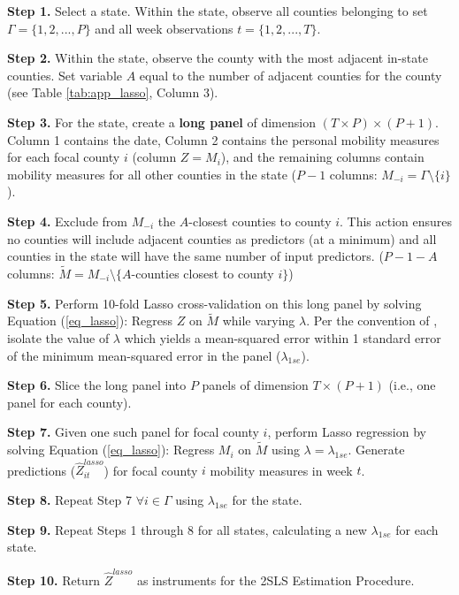  \noindent \textbf{Step 1.} Select a state. Within the state, observe all counties belonging to set $ \Gamma = \{1,2,...,P\}$ and all week observations $t=\{1,2,...,T\}$. \par
 \noindent \textbf{Step 2.} Within the state, observe the county with the most adjacent in-state counties. Set variable $A$ equal to the number of adjacent counties for the county (see Table \ref{tab:app_lasso}, Column 3).  \par
 \noindent \textbf{Step 3.} For the state, create a \textbf{long panel} of dimension $(T\times P) \times (P+1)$. Column 1 contains the date, Column 2 contains the personal mobility measures for each focal county $i$ (column $Z=M_i$), and the remaining columns contain mobility measures for all other counties in the state ($P-1$ columns: $M_{-i}= \Gamma \setminus \{i\}$). \par
 \noindent \textbf{Step 4.} Exclude from $M_{-i}$ the $A$-closest counties to county $i$. This action ensures no counties will include adjacent counties as predictors (at a minimum) and all counties in the state will have the same number of input predictors. ($P-1-A$ columns: $\tilde{M} = M_{-i} \setminus \{A$-counties closest to county $i\}$) \par
 \noindent \textbf{Step 5.} Perform 10-fold Lasso cross-validation on this long panel by solving Equation (\ref{eq_lasso}): Regress $Z$ on $\tilde{M}$ while varying $\lambda$. Per the convention of \cite{Friedman2010}, isolate the value of $\lambda$ which yields a mean-squared error within 1 standard error of the minimum mean-squared error in the panel ($\lambda_{1se}$). \par
 \noindent \textbf{Step 6.} Slice the long panel into $P$ panels of dimension $T \times (P+1)$ (i.e., one panel for each county). \par
 \noindent \textbf{Step 7.} Given one such panel for focal county $i$, perform Lasso regression by solving Equation (\ref{eq_lasso}): Regress $M_i$ on $\tilde{M}$ using $\lambda = \lambda_{1se}$. Generate predictions ($\hat{Z}_{it}^{lasso}$) for focal county $i$ mobility measures in week $t$. \par
 \noindent \textbf{Step 8.} Repeat Step 7 $\forall i \in \Gamma$ using $\lambda_{1se}$ for the state. \par
 \noindent \textbf{Step 9.} Repeat Steps 1 through 8 for all states, calculating a new $\lambda_{1se}$ for each state. \par
 \noindent \textbf{Step 10.} Return $\hat{Z}^{lasso}$ as instruments for the 2SLS Estimation Procedure.

